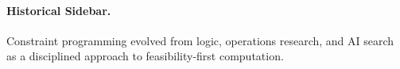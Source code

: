 \paragraph{Historical Sidebar.} Constraint programming evolved from logic, operations research, and AI search as a disciplined approach to feasibility-first computation.\n